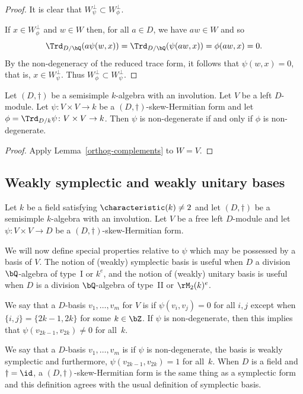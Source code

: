 \begin{proof}
It is clear that $W_\psi^\perp \subset W_\phi^\perp$.

If $x \in W_\phi^\perp$ and $w \in W$ then, for all $a \in D$, we have $aw \in W$ and so
\[
\Trd_{D/\bQ}(a\psi(w,x)) = \Trd_{D/\bQ}(\psi(aw,x)) = \phi(aw,x) = 0.
\]
By the non-degeneracy of the reduced trace form, it follows that $\psi(w,x) = 0$, that is, $x \in W_\psi^\perp$.
Thus $W_\phi^\perp \subset W_\psi^\perp$.
\end{proof}

\begin{corollary} \label{tr-non-deg}
Let $(D, \dag)$ be a semisimple $k$-algebra with an involution.
Let $V$ be a left $D$-module.
Let $\psi \colon V \times V \to k$ be a $(D,\dag)$-skew-Hermitian form and let $\phi = \Trd_{D/k} \psi \colon V \times V \to k$.
Then $\psi$ is non-degenerate if and only if $\phi$ is non-degenerate.
\end{corollary}

\begin{proof}
Apply Lemma~\ref{orthog-complements} to $W = V$.
\end{proof}

\subsection{Weakly symplectic and weakly unitary bases} \label{subsec:unitary-bases}

Let $k$ be a field satisfying $\characteristic(k) \neq 2$ and let $(D,\dag)$ be a semisimple $k$-algebra with an involution.
Let $V$ be a free left $D$-module and let $\psi \colon V \times V \to D$ be a $(D,\dag)$-skew-Hermitian form.

We will now define special properties relative to $\psi$ which may be possessed by a basis of $V$. The notion of (weakly) symplectic basis is useful when $D$ a division $\bQ$\nobreakdash-al\-gebra of type~I or $k^e$, and the notion of (weakly) unitary basis is useful when $D$ is a division $\bQ$-algebra of type~II or $\rM_2(k)^e$.

We say that a $D$-basis $v_1, \dotsc, v_m$ for $V$ is  if $\psi(v_i, v_j) = 0$ for all $i, j$ except when $\{i,j\} = \{2k-1,2k\}$ for some $k \in \bZ$.
If $\psi$ is non-degenerate, then this implies that $\psi(v_{2k-1}, v_{2k}) \neq 0$ for all~$k$.

We say that a $D$-basis $v_1, \dotsc, v_m$ is  if $\psi$ is non-degenerate, the basis is weakly symplectic and furthermore, $\psi(v_{2k-1}, v_{2k}) = 1$ for all~$k$.
When $D$ is a field and $\dag=\id$, a $(D,\dag)$-skew-Hermitian form is the same thing as a symplectic form and this definition agrees with the usual definition of symplectic basis.

